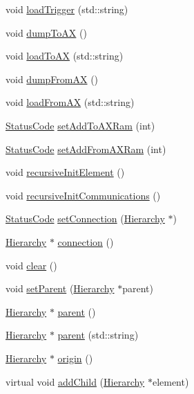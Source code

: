 \begin{DoxyCompactItemize}
\item 
void \hyperlink{classA3PE_a34a9499a0d9065a1b5772880d7e8d5c4}{loadTrigger} (std::string)
\item 
void \hyperlink{classA3PE_ad6b6f1ae4ac23e6d0827eee8cc2c98e4}{dumpToAX} ()
\item 
void \hyperlink{classA3PE_a40017b4138705690f8b04e336a7ffcdf}{loadToAX} (std::string)
\item 
void \hyperlink{classA3PE_a60a510251ec2b5fd800af2ba88e9fdac}{dumpFromAX} ()
\item 
void \hyperlink{classA3PE_a65235f7d42e8f7fb6056f5629545d2aa}{loadFromAX} (std::string)
\item 
\hyperlink{classStatusCode}{StatusCode} \hyperlink{classA3PE_a54fe4da570ea8833fe2c981de1085387}{setAddToAXRam} (int)
\item 
\hyperlink{classStatusCode}{StatusCode} \hyperlink{classA3PE_a834fde5951d2c1bf6b41842520360fce}{setAddFromAXRam} (int)
\item 
void \hyperlink{classElement_a3c0abcb36f8906688bb7e32608df7086}{recursiveInitElement} ()
\item 
void \hyperlink{classElement_a82119ed37dff76508a2746a853ec35ba}{recursiveInitCommunications} ()
\item 
\hyperlink{classStatusCode}{StatusCode} \hyperlink{classElement_ab476b4b1df5954141ceb14f072433b89}{setConnection} (\hyperlink{classHierarchy}{Hierarchy} $\ast$)
\item 
\hyperlink{classHierarchy}{Hierarchy} $\ast$ \hyperlink{classElement_af57444353c1ddf9fa0109801e97debf7}{connection} ()
\item 
void \hyperlink{classHierarchy_af4d43b0765b402670eed2d62c73405af}{clear} ()
\item 
void \hyperlink{classHierarchy_a585ad1aeec16077a0e532ab8b4fc557b}{setParent} (\hyperlink{classHierarchy}{Hierarchy} $\ast$parent)
\item 
\hyperlink{classHierarchy}{Hierarchy} $\ast$ \hyperlink{classHierarchy_a1c7bec8257e717f9c1465e06ebf845fc}{parent} ()
\item 
\hyperlink{classHierarchy}{Hierarchy} $\ast$ \hyperlink{classHierarchy_ad550588733bf75ac5c0fcfd7c8fd11a6}{parent} (std::string)
\item 
\hyperlink{classHierarchy}{Hierarchy} $\ast$ \hyperlink{classHierarchy_aee461dc930ce3871636ff87f075b1b83}{origin} ()
\item 
virtual void \hyperlink{classHierarchy_ad677774ff38fcb257c04a3a10d471fac}{addChild} (\hyperlink{classHierarchy}{Hierarchy} $\ast$element)

\end{DoxyCompactItemize}

